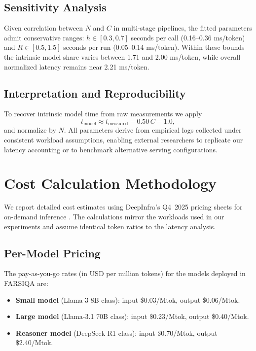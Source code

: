 \documentclass[11pt]{article}
\begin{document}
\subsection{Sensitivity Analysis}

Given correlation between $N$ and $C$ in multi-stage pipelines, the fitted parameters admit conservative ranges: $h \in [0.3,0.7]$ seconds per call (0.16--0.36 ms/token) and $R \in [0.5,1.5]$ seconds per run (0.05--0.14 ms/token). Within these bounds the intrinsic model share varies between 1.71 and 2.00 ms/token, while overall normalized latency remains near 2.21 ms/token.

\subsection{Interpretation and Reproducibility}

To recover intrinsic model time from raw measurements we apply
\begin{equation}
  t_{\mathrm{model}} \approx t_{\mathrm{measured}} - 0.50\,C - 1.0,
\end{equation}
and normalize by $N$. All parameters derive from empirical logs collected under consistent workload assumptions, enabling external researchers to replicate our latency accounting or to benchmark alternative serving configurations.

\section{Cost Calculation Methodology}
\label{sec:appendix-cost}

We report detailed cost estimates using DeepInfra's Q4~2025 pricing sheets for on-demand inference \cite{DeepInfraPricing2025}. The calculations mirror the workloads used in our experiments and assume identical token ratios to the latency analysis.

\subsection{Per-Model Pricing}

The pay-as-you-go rates (in USD per million tokens) for the models deployed in FARSIQA are:
\begin{itemize}
  \item \textbf{Small model} (Llama-3 8B class): input \$0.03/Mtok, output \$0.06/Mtok.
  \item \textbf{Large model} (Llama-3.1 70B class): input \$0.23/Mtok, output \$0.40/Mtok.
  \item \textbf{Reasoner model} (DeepSeek-R1 class): input \$0.70/Mtok, output \$2.40/Mtok.
\end{itemize}
\end{document}

